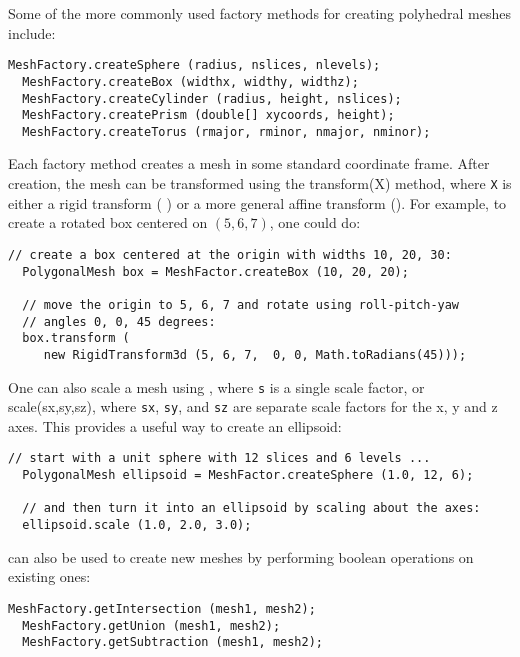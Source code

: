 Some of the more commonly used factory methods for creating polyhedral
meshes include:
%
\begin{lstlisting}[]
  MeshFactory.createSphere (radius, nslices, nlevels);
  MeshFactory.createBox (widthx, widthy, widthz);
  MeshFactory.createCylinder (radius, height, nslices);
  MeshFactory.createPrism (double[] xycoords, height);
  MeshFactory.createTorus (rmajor, rminor, nmajor, nminor);
\end{lstlisting}
%
Each factory method creates a mesh in some standard coordinate
frame. After creation, the mesh can be transformed using the
%
{transform(X)} method, where {\tt X} is either a rigid transform (
) or a more general affine
transform ().
For example, to create a rotated box centered on $(5, 6, 7)$,
one could do:
%
\begin{lstlisting}[]
  // create a box centered at the origin with widths 10, 20, 30:
  PolygonalMesh box = MeshFactor.createBox (10, 20, 20);

  // move the origin to 5, 6, 7 and rotate using roll-pitch-yaw
  // angles 0, 0, 45 degrees:
  box.transform (
     new RigidTransform3d (5, 6, 7,  0, 0, Math.toRadians(45)));
\end{lstlisting}
%
One can also scale a mesh using
,
where {\tt s} is a single scale factor, or
%
{scale(sx,sy,sz)}, where {\tt sx}, {\tt sy}, and {\tt sz} are separate
scale factors for the x, y and z axes. This provides a useful way to
create an ellipsoid:
%
\begin{lstlisting}[]
   // start with a unit sphere with 12 slices and 6 levels ...
  PolygonalMesh ellipsoid = MeshFactor.createSphere (1.0, 12, 6);

  // and then turn it into an ellipsoid by scaling about the axes:
  ellipsoid.scale (1.0, 2.0, 3.0);
\end{lstlisting}
%
 can also be used to create
new meshes by performing boolean operations on existing ones:
%
\begin{lstlisting}[]
  MeshFactory.getIntersection (mesh1, mesh2);
  MeshFactory.getUnion (mesh1, mesh2);
  MeshFactory.getSubtraction (mesh1, mesh2);
\end{lstlisting}
%

